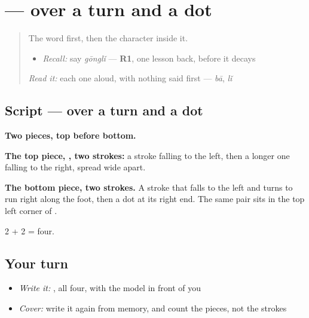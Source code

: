 \section[\texorpdfstring{\zh{公} (gōng)}{公 (gōng)}]{ —  over a turn and a dot}

\label{lesson:ZH-W205-gong-public}



\begin{quote}
The word first, then the character inside it.

\begin{itemize}
\raggedright
  \item \emph{Recall:} say \emph{gōnglǐ} — \textbf{R1}, one lesson back, before it decays
\end{itemize}

\begin{quote}
 
\end{quote}

\emph{Read it:} each one aloud, with nothing said first — \emph{bā}, \emph{lǐ}
\end{quote}

\subsection*{Script —  over a turn and a dot}

\begin{quote}
\end{quote}

\textbf{Two pieces, top before bottom.}

\textbf{The top piece, , two strokes:} a stroke falling to the left, then a longer one falling to the right, spread wide apart.

\textbf{The bottom piece, two strokes.} A stroke that falls to the left and turns to run right along the foot, then a dot at its right end. The same pair sits in the top left corner of .

2 + 2 = four.

\subsection*{Your turn}
\begin{itemize}
\raggedright
  \item \emph{Write it:} , all four, with the model in front of you
  \item \emph{Cover:} write it again from memory, and count the pieces, not the strokes
\end{itemize}

